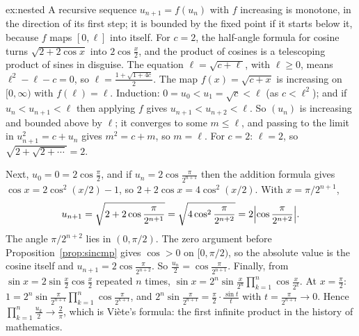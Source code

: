 \begin{solution}{ex:nested}
\idea A recursive sequence $u_{n+1}=f(u_n)$ with $f$ increasing is monotone, in the direction of its first step; it is bounded by the fixed point if it starts below it, because $f$ maps $[0,\ell]$ into itself. For $c=2$, the half-angle formula for cosine turns $\sqrt{2+2\cos x}$ into $2\cos\frac x2$, and the product of cosines is a telescoping product of sines in disguise.
\writeup The equation $\ell=\sqrt{c+\ell}$, with $\ell\ge0$, means $\ell^2-\ell-c=0$, so $\ell=\frac{1+\sqrt{1+4c}}2$. The map $f(x)=\sqrt{c+x}$ is increasing on $[0,\infty)$ with $f(\ell)=\ell$.
Induction: $0=u_0<u_1=\sqrt c<\ell$ (as $c<\ell^2$); and if $u_n<u_{n+1}<\ell$ then applying $f$ gives $u_{n+1}<u_{n+2}<\ell$. So $(u_n)$ is increasing and bounded above by $\ell$; it converges to some $m\le\ell$, and passing to the limit in $u_{n+1}^2=c+u_n$ gives $m^2=c+m$, so $m=\ell$.
For $c=2$: $\ell=2$, so $\sqrt{2+\sqrt{2+\cdots}}=2$.

Next, $u_0=0=2\cos\frac\pi2$, and if $u_n=2\cos\frac\pi{2^{n+1}}$ then the addition formula gives $\cos x=2\cos^2(x/2)-1$, so $2+2\cos x=4\cos^2(x/2)$. With $x=\pi/2^{n+1}$,
\[
u_{n+1}=\sqrt{2+2\cos\frac\pi{2^{n+1}}}=\sqrt{4\cos^2\frac\pi{2^{n+2}}}=2\Bigl|\cos\frac\pi{2^{n+2}}\Bigr|.
\]
The angle $\pi/2^{n+2}$ lies in $(0,\pi/2)$. The zero argument before Proposition~\ref{prop:sincmp} gives $\cos>0$ on $[0,\pi/2)$, so the absolute value is the cosine itself and $u_{n+1}=2\cos\frac\pi{2^{n+2}}$. So $\frac{u_n}2=\cos\frac\pi{2^{n+1}}$.
Finally, from $\sin x=2\sin\frac x2\cos\frac x2$ repeated $n$ times, $\sin x=2^n\sin\frac x{2^n}\prod_{k=1}^n\cos\frac x{2^k}$. At $x=\frac\pi2$:
$1=2^n\sin\frac\pi{2^{n+1}}\prod_{k=1}^n\cos\frac\pi{2^{k+1}}$, and $2^n\sin\frac\pi{2^{n+1}}=\frac\pi2\cdot\frac{\sin t}t$ with $t=\frac\pi{2^{n+1}}\to0$. Hence
$\prod_{k=1}^n\frac{u_k}2\to\frac2\pi$, which is Vi\`ete's formula: the first infinite product in the history of mathematics.
\end{solution}

